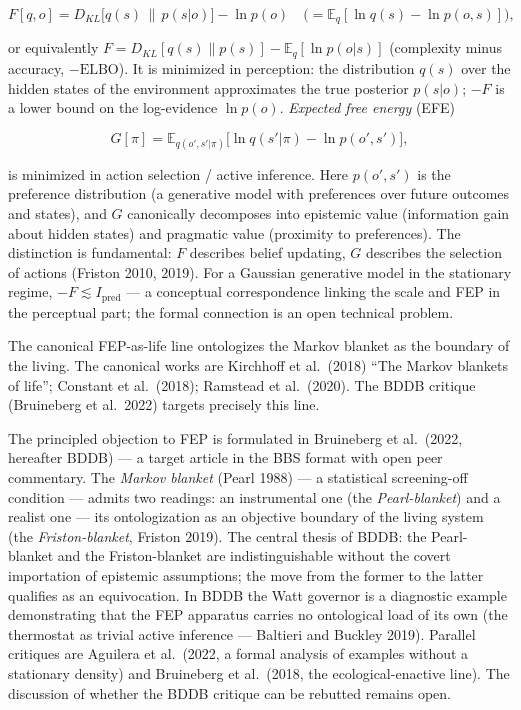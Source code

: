 \documentclass[pdflatex,sn-mathphys-ay]{sn-jnl}
\begin{document}
\begin{equation}F[q, o] = D_{KL}\bigl[q(s) \,\|\, p(s|o)\bigr] - \ln p(o) \quad \bigl(= \mathbb{E}_q[\ln q(s) - \ln p(o, s)]\bigr), \tag{3}\end{equation}

or equivalently \(F = D_{KL}[q(s) \| p(s)] - \mathbb{E}_q[\ln p(o|s)]\) (complexity minus accuracy, \(-\text{ELBO}\)). It is minimized in perception: the distribution \(q(s)\) over the hidden states of the environment approximates the true posterior \(p(s|o)\); \(-F\) is a lower bound on the log-evidence \(\ln p(o)\). \emph{Expected free energy} (EFE)

\begin{equation}G[\pi] = \mathbb{E}_{q(o', s'|\pi)}\bigl[\ln q(s'|\pi) - \ln p(o', s')\bigr], \tag{4}\end{equation}

is minimized in action selection / active inference. Here \(p(o', s')\) is the preference distribution (a generative model with preferences over future outcomes and states), and \(G\) canonically decomposes into epistemic value (information gain about hidden states) and pragmatic value (proximity to preferences). The distinction is fundamental: \(F\) describes belief updating, \(G\) describes the selection of actions (Friston 2010, 2019). For a Gaussian generative model in the stationary regime, \(-F \lesssim I_{\text{pred}}\) --- a conceptual correspondence linking the scale and FEP in the perceptual part; the formal connection is an open technical problem.

The canonical FEP-as-life line ontologizes the Markov blanket as the boundary of the living. The canonical works are Kirchhoff et al.~(2018) ``The Markov blankets of life''; Constant et al.~(2018); Ramstead et al.~(2020). The BDDB critique (Bruineberg et al.~2022) targets precisely this line.

The principled objection to FEP is formulated in Bruineberg et al.~(2022, hereafter BDDB) --- a target article in the BBS format with open peer commentary. The \emph{Markov blanket} (Pearl 1988) --- a statistical screening-off condition --- admits two readings: an instrumental one (the \emph{Pearl-blanket}) and a realist one --- its ontologization as an objective boundary of the living system (the \emph{Friston-blanket}, Friston 2019). The central thesis of BDDB: the Pearl-blanket and the Friston-blanket are indistinguishable without the covert importation of epistemic assumptions; the move from the former to the latter qualifies as an equivocation. In BDDB the Watt governor is a diagnostic example demonstrating that the FEP apparatus carries no ontological load of its own (the thermostat as trivial active inference --- Baltieri and Buckley 2019). Parallel critiques are Aguilera et al.~(2022, a formal analysis of examples without a stationary density) and Bruineberg et al.~(2018, the ecological-enactive line). The discussion of whether the BDDB critique can be rebutted remains open.
\end{document}
